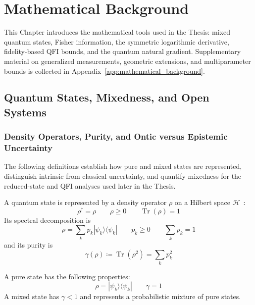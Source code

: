 \chapter{Mathematical Background}
\label{ch:MathBackground}

This Chapter introduces the mathematical tools used in the Thesis: mixed quantum states, Fisher information, the symmetric logarithmic derivative, fidelity-based QFI bounds, and the quantum natural gradient. Supplementary material on generalized measurements, geometric extensions, and multiparameter bounds is collected in Appendix~\ref{app:mathematical_background}.

\section{Quantum States, Mixedness, and Open Systems}

\subsection{Density Operators, Purity, and Ontic versus Epistemic Uncertainty}

The following definitions establish how pure and mixed states are represented, distinguish intrinsic from classical uncertainty, and quantify mixedness for the reduced-state and QFI analyses used later in the Thesis.

\begin{definition}
    A quantum state is represented by a density operator $\rho$ on a Hilbert space $\mathcal{H}$~\cite{nielsen_chuang_2010_quantum_computation_and_quantum_information, Sakurai_Napolitano_2020}:
    \begin{equation}
        \rho^\dagger = \rho \qquad \rho \geq 0 \qquad \operatorname{Tr}(\rho)=1
    \end{equation}
    Its spectral decomposition is
    \begin{equation}
        \rho = \sum_k p_k |\psi_k\rangle\langle\psi_k| \qquad p_k\geq0\qquad \sum_k p_k=1
    \end{equation}
    and its purity is
    \begin{equation}
        \gamma(\rho) \coloneqq \operatorname{Tr}(\rho^2)=\sum_kp_k^2
    \end{equation}
\end{definition}

\begin{definition}
    A pure state has the following properties:
    \begin{equation}
        \rho = |\psi_k\rangle\langle\psi_k|
        \qquad \gamma=1
    \end{equation}
    A mixed state has $\gamma<1$ and represents a probabilistic mixture of pure states.
\end{definition}


